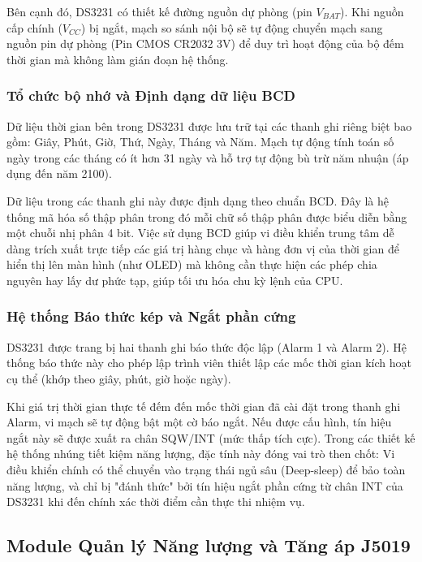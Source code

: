 \documentclass[12pt, a4paper, oneside]{article}
\begin{document}
Bên cạnh đó, DS3231 có thiết kế đường nguồn dự phòng (pin $V_{BAT}$). Khi nguồn cấp chính ($V_{CC}$) bị ngắt, mạch so sánh nội bộ sẽ tự động chuyển mạch sang nguồn pin dự phòng (Pin CMOS CR2032 3V) để duy trì hoạt động của bộ đếm thời gian mà không làm gián đoạn hệ thống.

\subsubsection{Tổ chức bộ nhớ và Định dạng dữ liệu BCD}

Dữ liệu thời gian bên trong DS3231 được lưu trữ tại các thanh ghi riêng biệt bao gồm: Giây, Phút, Giờ, Thứ, Ngày, Tháng và Năm. Mạch tự động tính toán số ngày trong các tháng có ít hơn 31 ngày và hỗ trợ tự động bù trừ năm nhuận (áp dụng đến năm 2100).

Dữ liệu trong các thanh ghi này được định dạng theo chuẩn BCD. Đây là hệ thống mã hóa số thập phân trong đó mỗi chữ số thập phân được biểu diễn bằng một chuỗi nhị phân 4 bit. Việc sử dụng BCD giúp vi điều khiển trung tâm dễ dàng trích xuất trực tiếp các giá trị hàng chục và hàng đơn vị của thời gian để hiển thị lên màn hình (như OLED) mà không cần thực hiện các phép chia nguyên hay lấy dư phức tạp, giúp tối ưu hóa chu kỳ lệnh của CPU.

\subsubsection{Hệ thống Báo thức kép và Ngắt phần cứng}

DS3231 được trang bị hai thanh ghi báo thức độc lập (Alarm 1 và Alarm 2). Hệ thống báo thức này cho phép lập trình viên thiết lập các mốc thời gian kích hoạt cụ thể (khớp theo giây, phút, giờ hoặc ngày).

Khi giá trị thời gian thực tế đếm đến mốc thời gian đã cài đặt trong thanh ghi Alarm, vi mạch sẽ tự động bật một cờ báo ngắt. Nếu được cấu hình, tín hiệu ngắt này sẽ được xuất ra chân SQW/INT (mức thấp tích cực). Trong các thiết kế hệ thống nhúng tiết kiệm năng lượng, đặc tính này đóng vai trò then chốt: Vi điều khiển chính có thể chuyển vào trạng thái ngủ sâu (Deep-sleep) để bảo toàn năng lượng, và chỉ bị "đánh thức" bởi tín hiệu ngắt phần cứng từ chân INT của DS3231 khi đến chính xác thời điểm cần thực thi nhiệm vụ.

\subsection{Module Quản lý Năng lượng và Tăng áp J5019}
\end{document}
